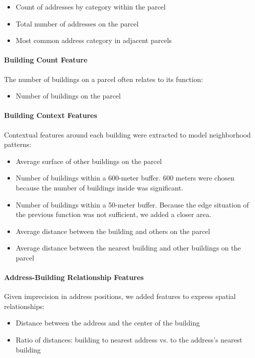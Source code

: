 \documentclass[11pt]{article}
\begin{document}
\begin{itemize}
    \item Count of addresses by category within the parcel
    \item Total number of addresses on the parcel
    \item Most common address category in adjacent parcels
\end{itemize}

\paragraph{Building Count Feature}
The number of buildings on a parcel often relates to its function:

\begin{itemize}
    \item Number of buildings on the parcel
\end{itemize}

\paragraph{Building Context Features}
Contextual features around each building were extracted to model neighborhood patterns:

\begin{itemize}
    \item Average surface of other buildings on the parcel
    \item Number of buildings within a 600-meter buffer. 600 meters were chosen because the number of buildings inside was significant.
    \item Number of buildings within a 50-meter buffer. Because the edge situation of the previous function was not sufficient, we added a closer area.
    \item Average distance between the building and others on the parcel
    \item Average distance between the nearest building and other buildings on the parcel
\end{itemize}

\paragraph{Address-Building Relationship Features}
Given imprecision in address positions, we added features to express spatial relationships:

\begin{itemize}
    \item Distance between the address and the center of the building
    \item Ratio of distances: building to nearest address vs. to the address's nearest building
\end{itemize}
\end{document}
